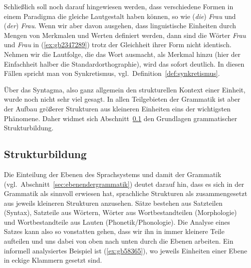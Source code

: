 Schließlich soll noch darauf hingewiesen werden, dass verschiedene Formen in einem Paradigma die gleiche Lautgestalt haben können, so wie (\textit{die}) \textit{Frau} und (\textit{der}) \textit{Frau}.
Wenn wir aber davon ausgehen, dass linguistische Einheiten durch Mengen von Merkmalen und Werten definiert werden, dann sind die Wörter \textit{Frau} und \textit{Frau} in (\ref{ex:gb2347289}) trotz der Gleichheit ihrer Form nicht identisch.
Nehmen wir die Lautfolge, die das Wort ausmacht, als Merkmal hinzu (hier der Einfachheit halber die Standardorthographie), wird das sofort deutlich.
In diesen Fällen spricht man von Synkretismus, vgl.\ Definition~\ref{def:synkretismus}.

\begin{exe}
  \ex\label{ex:gb2347289}
  \begin{xlist}
  \end{xlist}
\end{exe}


Über das Syntagma, also ganz allgemein den strukturellen Kontext einer Einheit, wurde noch nicht sehr viel gesagt.
In allen Teilgebieten der Grammatik ist aber der Aufbau größerer Strukturen aus kleineren Einheiten eins der wichtigsten Phänomene.
Daher widmet sich Abschnitt~\ref{sec:strukturbildung} den Grundlagen grammatischer Strukturbildung.

\subsection{Strukturbildung}

\label{sec:strukturbildung}

Die Einteilung der Ebenen des Sprachsystems und damit der Grammatik (vgl.\ Abschnitt~\ref{sec:ebenendergrammatik}) deutet darauf hin, dass es sich in der Grammatik als sinnvoll erwiesen hat, sprachliche Strukturen als zusammengesetzt aus jeweils kleineren Strukturen anzusehen.
Sätze bestehen aus Satzteilen (Syntax), Satzteile aus Wörtern, Wörter aus Wortbestandteilen (Morphologie) und Wortbestandteile aus Lauten (Phonetik\slash Phonologie).
Die Analyse eines Satzes kann also so vonstatten gehen, dass wir ihn in immer kleinere Teile aufteilen und uns dabei von oben nach unten durch die Ebenen arbeiten.
Ein informell analysiertes Beispiel ist (\ref{ex:gb58365}), wo jeweils Einheiten einer Ebene in eckige Klammern gesetzt sind.

